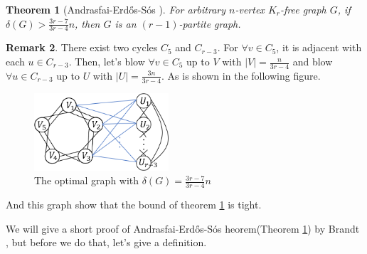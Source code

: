 \documentclass{article}
\newtheorem{theorem}{Theorem}[section]
\theoremstyle{definition}
\newtheorem{remark}[theorem]{Remark}
\def\Erdos{Erd\H{o}s}
\begin{document}
\begin{theorem}[Andrasfai-\Erdos{}-S\'os \cite{ANDRASFAI1974205}]\label{AES}
For arbitrary $n$-vertex $K_r$-free graph $G$, if $\delta(G) > \frac{3r-7}{3r-4}n$, then $G$ is an $(r-1)$-partite graph.
\end{theorem}
\begin{remark}\label{TightBdofAES}
There exist two cycles $C_5$ and $C_{r-3}$. For $\forall v \in C_5$, it is adjacent with each $u \in C_{r-3}$. Then, let's blow $\forall v \in C_5$ up to $V$ with $|V|=\frac{n}{3r-4}$ and blow $\forall u \in C_{r-3}$ up to $U$ with $|U|=\frac{3n}{3r-4}$. As is shown in the following figure.
    \begin{figure}[htbp]
	\centering
	\includegraphics[width=5cm]{7-1.png}
        \caption{The optimal graph with $\delta(G) = \frac{3r-7}{3r-4}n$}
	\label{fig:7-1}
    \end{figure}

And this graph show that the bound of theorem \ref{AES} is tight.
\end{remark}
We will give a short proof of Andrasfai-\Erdos{}-S\'os heorem(Theorem \ref{AES}) by Brandt \cite{article}, but before we do that, let's give a definition.
\end{document}
